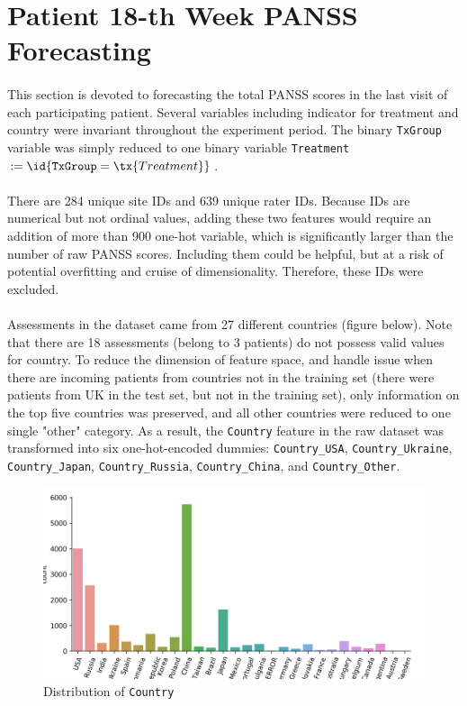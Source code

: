 \documentclass[11pt]{article}
\begin{document}
	\section{Patient 18-th Week PANSS Forecasting}

	\paragraph{} This section is devoted to forecasting the total PANSS scores in the last visit of each participating patient. Several variables including indicator for treatment and country were invariant throughout the experiment period. The binary \texttt{TxGroup} variable was simply reduced to one binary variable \texttt{Treatment} $:= \id{\texttt{TxGroup} = \tx{Treatment}}$.
	
	\paragraph{} There are 284 unique site IDs and 639 unique rater IDs. Because IDs are numerical but not ordinal values, adding these two features would require an addition of more than 900 one-hot variable, which is significantly larger than the number of raw PANSS scores. Including them could be helpful, but at a risk of potential overfitting and cruise of dimensionality. Therefore, these IDs were excluded.
	\paragraph{} Assessments in the dataset came from 27 different countries (figure below). Note that there are 18 assessments (belong to 3 patients) do not possess valid values for country. To reduce the dimension of feature space, and handle issue when there are incoming patients from countries not in the training set (there were patients from UK in the test set, but not in the training set), only information on the top five countries was preserved, and all other countries were reduced to one single "other" category. As a result, the \texttt{Country} feature in the raw dataset was transformed into six one-hot-encoded dummies: \texttt{Country\_USA}, \texttt{Country\_Ukraine}, \texttt{Country\_Japan}, \texttt{Country\_Russia}, \texttt{Country\_China}, and \texttt{Country\_Other}.

	\begin{figure}[H]
		\centering
		\includegraphics[width=0.7\linewidth]{figures/dist_country.png}
		\caption{Distribution of \texttt{Country}}
	\end{figure}
\end{document}
